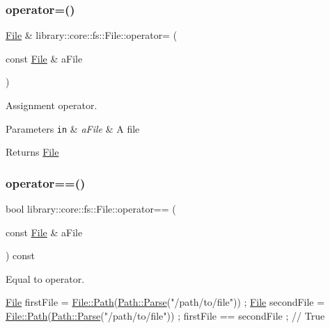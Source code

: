 \subsubsection{\texorpdfstring{operator=()}{operator=()}}
{\footnotesize\ttfamily \hyperlink{classlibrary_1_1core_1_1fs_1_1_file}{File} \& library\+::core\+::fs\+::\+File\+::operator= (\begin{DoxyParamCaption}\item[{const \hyperlink{classlibrary_1_1core_1_1fs_1_1_file}{File} \&}]{a\+File }\end{DoxyParamCaption})}



Assignment operator. 


\begin{DoxyParams}[1]{Parameters}
\mbox{\tt in}  & {\em a\+File} & A file \\
\hline
\end{DoxyParams}
\begin{DoxyReturn}{Returns}
\hyperlink{classlibrary_1_1core_1_1fs_1_1_file}{File} 
\end{DoxyReturn}
\mbox{\label{classlibrary_1_1core_1_1fs_1_1_file_a44ab79a23c5a129be298a026dbeec62f}} 
\subsubsection{\texorpdfstring{operator==()}{operator==()}}
{\footnotesize\ttfamily bool library\+::core\+::fs\+::\+File\+::operator== (\begin{DoxyParamCaption}\item[{const \hyperlink{classlibrary_1_1core_1_1fs_1_1_file}{File} \&}]{a\+File }\end{DoxyParamCaption}) const}



Equal to operator. 


\begin{DoxyCode}
\hyperlink{classlibrary_1_1core_1_1fs_1_1_file_a6f3f0d79545ac9984c6f49432f0c6c39}{File} firstFile = \hyperlink{classlibrary_1_1core_1_1fs_1_1_file_a72d6cdf8bb7e299889c6149e2b8a6cc7}{File::Path}(\hyperlink{classlibrary_1_1core_1_1fs_1_1_path_a6ba644b6609507e724c217bf2020f5ae}{Path::Parse}(\textcolor{stringliteral}{"/path/to/file"})) ;
\hyperlink{classlibrary_1_1core_1_1fs_1_1_file_a6f3f0d79545ac9984c6f49432f0c6c39}{File} secondFile = \hyperlink{classlibrary_1_1core_1_1fs_1_1_file_a72d6cdf8bb7e299889c6149e2b8a6cc7}{File::Path}(\hyperlink{classlibrary_1_1core_1_1fs_1_1_path_a6ba644b6609507e724c217bf2020f5ae}{Path::Parse}(\textcolor{stringliteral}{"/path/to/file"})) ;
firstFile == secondFile ; \textcolor{comment}{// True}
\end{DoxyCode}



